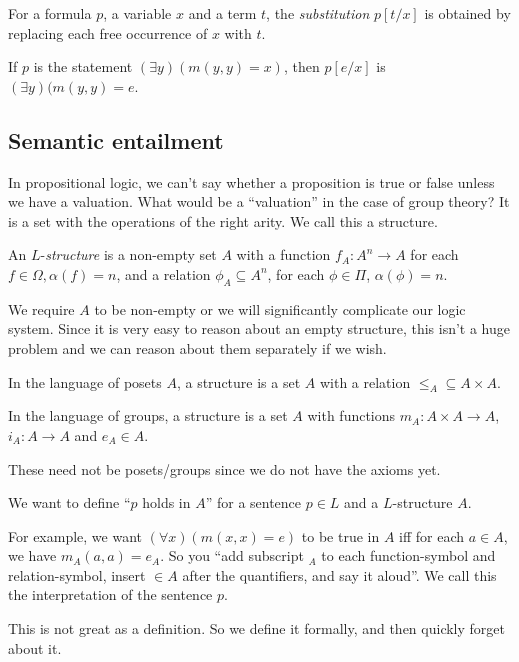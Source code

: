 \documentclass[a4paper]{article}
\begin{document}
\begin{defi}[Substitution]
  For a formula $p$, a variable $x$ and a term $t$, the \emph{substitution} $p[t/x]$ is obtained by replacing each free occurrence of $x$ with $t$.
\end{defi}

\begin{eg}
  If $p$ is the statement $(\exists y)(m(y, y) = x)$, then $p[e/x]$ is $(\exists y)(m(y, y) = e$.
\end{eg}
\subsection{Semantic entailment}
In propositional logic, we can't say whether a proposition is true or false unless we have a valuation. What would be a ``valuation'' in the case of group theory? It is a set with the operations of the right arity. We call this a structure.

\begin{defi}[Structure]
  An $L$-\emph{structure} is a non-empty set $A$ with a function $f_A: A^n \to A$ for each $f\in \Omega, \alpha(f) = n$, and a relation $\phi_A\subseteq A^n$, for each $\phi\in \Pi$, $\alpha(\phi) = n$.
\end{defi}
\note We require $A$ to be non-empty or we will significantly complicate our logic system. Since it is very easy to reason about an empty structure, this isn't a huge problem and we can reason about them separately if we wish.

\begin{eg}
  In the language of posets $A$, a structure is a set $A$ with a relation $\leq_A \subseteq A\times A$.

  In the language of groups, a structure is a set $A$ with functions $m_A: A\times A\to A$, $i_A: A\to A$ and $e_A\in A$.
\end{eg}
\note These need not be posets/groups since we do not have the axioms yet.

We want to define ``$p$ holds in $A$'' for a sentence $p\in L$ and a $L$-structure $A$.

For example, we want $(\forall x)(m(x, x) = e)$ to be true in $A$ iff for each $a\in A$, we have $m_A(a, a) = e_A$. So you ``add subscript $_A$ to each function-symbol and relation-symbol, insert $\in A$ after the quantifiers, and say it aloud''. We call this the interpretation of the sentence $p$.

This is not great as a definition. So we define it formally, and then quickly forget about it.
\end{document}

